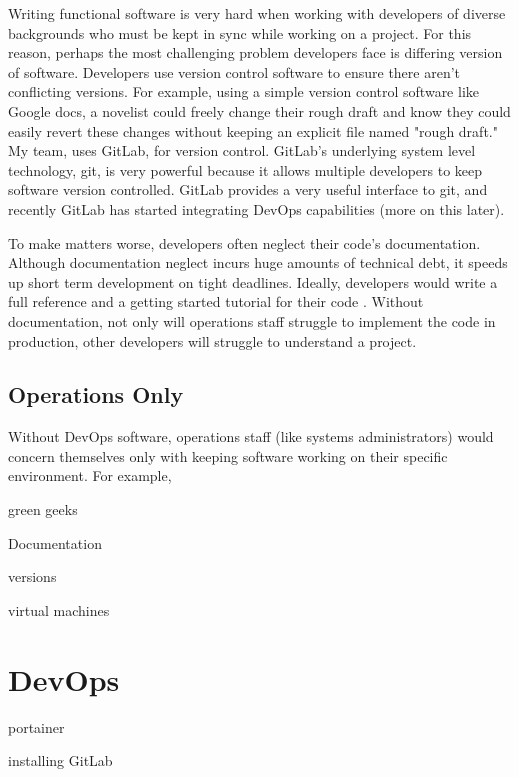 \documentclass[titlepage]{article}
\begin{document}
Writing functional software is very hard when working with developers of diverse backgrounds who must be kept in sync while working on a project. For this reason, perhaps the most challenging problem developers face is differing version of software. Developers use version control software to ensure there aren’t conflicting versions. For example, using a simple version control software like Google docs, a novelist could freely change their rough draft and know they could easily revert these changes without keeping an explicit file named "rough draft." My team, uses GitLab, for version control. GitLab's underlying system level technology, git, is very powerful because it allows multiple developers to keep software version controlled. GitLab provides a very useful interface to git, and recently GitLab has started integrating DevOps capabilities (more on this later).

To make matters worse, developers often neglect their code's documentation. Although documentation neglect incurs huge amounts of technical debt, it speeds up short term development on tight deadlines. Ideally, developers would write a full reference and a getting started tutorial for their code \cite{Dagenais:2010:CED:1882291.1882312}. Without documentation, not only will operations staff struggle to implement the code in production, other developers will struggle to understand a project. 



\subsection{Operations Only}

Without DevOps software, operations staff (like systems administrators) would concern themselves only with keeping software working on their specific environment. For example,  

green geeks

Documentation

versions

virtual machines

\section{DevOps}

portainer

installing GitLab







\setlength{\bibleftmargin}{.125in}
\doublespacing


\nocite{*}
\end{document}
